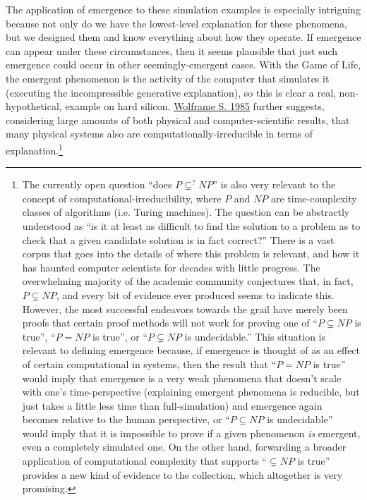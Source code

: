 \documentclass{article}
\newcommand{\ti}[1]{\textit{#1}}
\renewcommand{\cite}[1]{\hyperlink{#1}{#1}}
\begin{document}

The application of emergence to these simulation examples is especially intriguing because not only do we have the lowest-level explanation for these phenomena, but we designed them and know everything about how they operate. If emergence can appear under these circumstances, then it seems plausible that just such emergence could occur in other seemingly-emergent cases. With the Game of Life, the emergent phenomenon is the activity of the computer that simulates it (executing the incompressible generative explanation), so this is clear a real, non-hypothetical, example on hard silicon. \cite{Wolframe S. 1985} further suggests, considering large amounts of both physical and computer-scientific results, that many physical systems also are computationally-irreducible in terms of explanation.\footnote{The currently open question ``does $P \subsetneq^? NP$'' is also very relevant to the concept of computational-irreducibility, where $P$ and $NP$ are time-complexity classes of algorithms (i.e. Turing machines). The question can be abstractly understood as ``is it at least as difficult to find the solution to a problem as to check that a given candidate solution is in fact correct?'' There is a vast corpus that goes into the details of where this problem is relevant, and how it has haunted computer scientists for decades with little progress. The overwhelming majority of the academic community conjectures that, in fact, $P \subsetneq NP$, and every bit of evidence ever produced seems to indicate this. However, the most successful endeavors towards the grail have merely been proofs that certain proof methods will not work for proving one of ``$P \subsetneq NP$ is true'', ``$P = NP$ is true'', or ``$P \subsetneq NP$ is undecidable.'' This situation is relevant to defining emergence because, if emergence is thought of as an effect of certain computational in systems, then the result that ``$P = NP$ is true'' would imply that emergence is a very weak phenomena that doesn't scale with one's time-perspective (explaining emergent phenomena is reducible, but just takes a little less time than full-simulation) and emergence again becomes relative to the human perspective, or ``$P \subseteq NP$ is undecidable'' would imply that it is impossible to prove if a given phenomenon \ti{is} emergent, even a completely simulated one. On the other hand, forwarding a broader application of computational complexity that supports ``$ \subsetneq NP$ is true'' provides a new kind of evidence to the collection, which altogether is very promising. }
\end{document}
